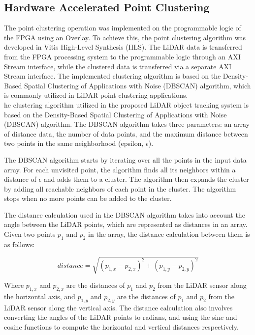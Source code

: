 \documentclass[journal]{IEEEtran} %
\begin{document}
\subsection{Hardware Accelerated Point Clustering}

The point clustering operation was implemented on the programmable logic of the FPGA using an Overlay. To achieve this, the point clustering algorithm was developed in Vitis High-Level Synthesis (HLS). The LiDAR data is transferred from the FPGA processing system to the programmable logic through an AXI Stream interface, while the clustered data is transferred via a separate AXI Stream interface. The implemented clustering algorithm is based on the Density-Based Spatial Clustering of Applications with Noise (DBSCAN) algorithm, which is commonly utilized in LiDAR point clustering applications.\\

he clustering algorithm utilized in the proposed LiDAR object tracking system is based on the Density-Based Spatial Clustering of Applications with Noise (DBSCAN) algorithm. The DBSCAN algorithm takes three parameters: an array of distance data, the number of data points, and the maximum distance between two points in the same neighborhood (epsilon, $\epsilon$).

The DBSCAN algorithm starts by iterating over all the points in the input data array. For each unvisited point, the algorithm finds all its neighbors within a distance of $\epsilon$ and adds them to a cluster. The algorithm then expands the cluster by adding all reachable neighbors of each point in the cluster. The algorithm stops when no more points can be added to the cluster.

The distance calculation used in the DBSCAN algorithm takes into account the angle between the LiDAR points, which are represented as distances in an array. Given two points $p_1$ and $p_2$ in the array, the distance calculation between them is as follows:

\[
distance = \sqrt{(p_{1,x} - p_{2,x})^2 + (p_{1,y} - p_{2,y})^2}
\]

Where $p_{1,x}$ and $p_{2,x}$ are the distances of $p_1$ and $p_2$ from the LiDAR sensor along the horizontal axis, and $p_{1,y}$ and $p_{2,y}$ are the distances of $p_1$ and $p_2$ from the LiDAR sensor along the vertical axis. The distance calculation also involves converting the angles of the LiDAR points to radians, and using the sine and cosine functions to compute the horizontal and vertical distances respectively.
\end{document}
